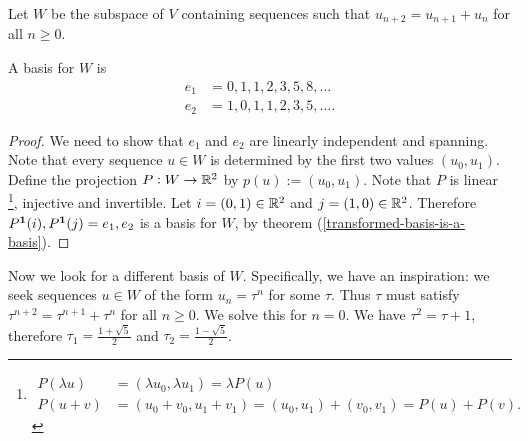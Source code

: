 Let $W$ be the subspace of $V$ containing sequences such that $u_{n+2} = u_{n+1} + u_n$ for all
$n \geq 0$.

\begin{comment}
  \begin{proof}
    $W$ is a subspace because:
    \begin{enumerate}
    \item $W$ contains the zero sequence.
    \item Let $(u)_{n\geq 0}, (v)_{n\geq 0} \in W$. Then
      $$(u + v)_{n+2} = u_{n+1} + u_n + v_{n + 1} + v_n = (u + v)_{n+1} + (u + v)_n,$$ and
      $$(\lambda u)_{n+2} = \lambda u_{n+1} + \lambda u_n = (\lambda u)_{n+1} + (\lambda u)_n.$$
    \end{enumerate}
  \end{proof}
\end{comment}

\begin{claim*}
  A basis for $W$ is
  \begin{align*}
    e_1 &= 0, 1, 1, 2, 3, 5, 8, \ldots\\
    e_2 &= 1, 0, 1, 1, 2, 3, 5, \ldots.
  \end{align*}
\end{claim*}
\begin{proof} We need to show that $e_1$ and $e_2$ are linearly independent and spanning.
  Note that every sequence $u \in W$ is determined by the first two values $(u_0, u_1)$.
  Define the projection $P: W \to \mathbb{R}^2$ by $p(u) := (u_0, u_1)$. Note that $P$ is linear \footnote{
    \begin{align*}
      P(\lambda u) &= (\lambda u_0, \lambda u_1) = \lambda P(u)\\
      P(u + v)     &= (u_0 + v_0, u_1 + v_1) = (u_0, u_1) + (v_0, v_1) = P(u) + P(v).
    \end{align*}
  }, injective and invertible.
  Let $i = (0, 1) \in \mathbb{R}^2$ and $j = (1, 0) \in \mathbb{R}^2$.
  Therefore $P^{\mathbf 1}(i), P^{\mathbf 1}(j) = e_1, e_2$ is a basis for $W$, by theorem (\ref{transformed-basis-is-a-basis}).
\end{proof}

Now we look for a different basis of $W$. Specifically, we have an inspiration: we seek sequences
$u \in W$ of the form $u_n = \tau^n$ for some $\tau$. Thus $\tau$ must satisfy
$\tau^{n+2} = \tau^{n+1} + \tau^n$ for all $n \geq 0$. We solve this for $n=0$.  We have
$\tau^2 = \tau + 1$, therefore $\tau_1 = \frac{1 + \sqrt{5}}{2}$ and
$\tau_2 = \frac{1 - \sqrt{5}}{2}$.

